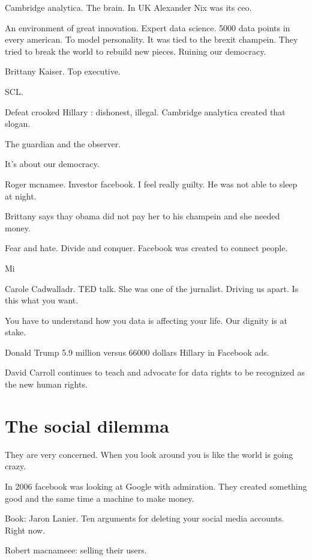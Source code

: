   Cambridge analytica. The brain. In UK 
  Alexander Nix was its ceo. 
  
  An environment of great innovation. 
  Expert data science. 
  5000 data points in every american. To model personality. 
  It was tied to the brexit champein. 
  They tried to break the world to rebuild new pieces. 
  Ruining our democracy. 
  
  Brittany Kaiser. Top executive. 
  
  SCL. 
  
  Defeat crooked Hillary : dishonest, illegal. Cambridge analytica created that slogan. 
  
  
  The guardian and the observer. 
  
  It's about our democracy. 
  
  Roger mcnamee. Investor facebook. 
  I feel really guilty. He was not able to sleep at night. 
  
  Brittany says thay obama did not pay her to his champein and she needed money. 
  
  Fear and hate. Divide and conquer. Facebook was created to connect people. 
  
  
  
   Mi
  
  
  
  Carole Cadwalladr. TED talk. She was one of the jurnalist. Driving us apart. Is this what you want. 
  
  You have to understand how you data is affecting your life. Our dignity is at stake. 
  
  Donald Trump 5.9 million versus 66000 dollars Hillary in Facebook ads. 
  
  David Carroll continues to teach and advocate for data rights to be recognized as the new human rights. 
  
  
 
       
 \section{The social dilemma}
 They are very concerned. 
 When you look around you is like the world is going crazy. 
 
 In 2006 facebook was looking at Google with admiration. They created something good and the same time a machine to make money. 
 
 Book: Jaron Lanier. Ten arguments for deleting your social media accounts. Right now. 
 
 Robert macnameee: selling their users. 
 
